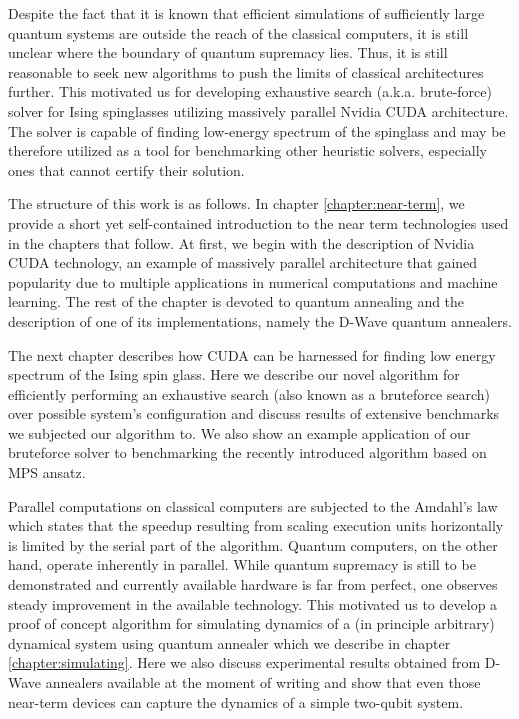 Despite the fact that it is known that efficient simulations of sufficiently large quantum systems are outside the reach of the classical computers, it is still unclear where the boundary of quantum supremacy lies. Thus, it is still reasonable to seek new algorithms to push the limits of classical architectures further. This motivated us for developing exhaustive search (a.k.a. brute-force) solver for Ising spinglasses utilizing massively parallel Nvidia CUDA architecture. The solver is capable of finding low-energy spectrum of the spinglass and may be therefore utilized as a tool for benchmarking other heuristic solvers, especially ones that cannot certify their solution.

The structure of this work is as follows. In chapter \ref{chapter:near-term}, we provide a short yet self-contained introduction to the near term technologies used in the chapters that follow. At first, we begin with the description of Nvidia CUDA technology, an example of massively parallel architecture that gained popularity due to multiple applications in numerical computations and machine learning. The rest of the chapter is devoted to quantum annealing and the description of one of its implementations, namely the D-Wave quantum annealers.

The next chapter describes how CUDA can be harnessed for finding low energy spectrum of the Ising spin glass. Here we describe our novel algorithm for efficiently performing an exhaustive search (also known as a bruteforce search) over possible system's configuration and discuss results of extensive benchmarks we subjected our algorithm to. We also show an example application of our bruteforce solver to benchmarking the recently introduced algorithm based on MPS ansatz.

Parallel computations on classical computers are subjected to the Amdahl's law which states that the speedup resulting from scaling execution units horizontally is limited by the serial part of the algorithm. Quantum computers, on the other hand, operate inherently in parallel. While quantum supremacy is still to be demonstrated and currently available hardware is far from perfect, one observes steady improvement in the available technology. This motivated us to develop a proof of concept algorithm for simulating dynamics of a (in principle arbitrary) dynamical system using quantum annealer which we describe in chapter \ref{chapter:simulating}. Here we also discuss experimental results obtained from D-Wave annealers available at the moment of writing and show that even those near-term devices can capture the dynamics of a simple two-qubit system.

